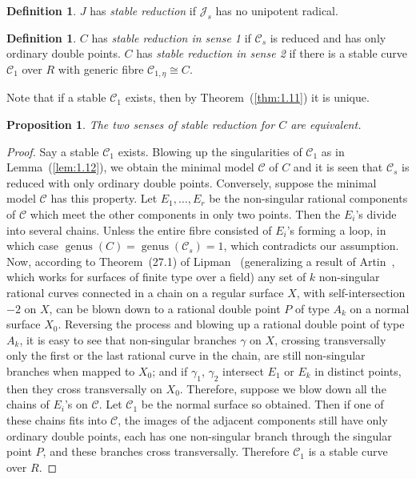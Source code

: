 \documentclass[10pt]{amsart}
\theoremstyle{plain}
\newtheorem{proposition}[theorem]{Proposition}
\theoremstyle{definition}
\newtheorem{definition}[theorem]{Definition}
\DeclareMathOperator{\genus}{genus}
\begin{document}
\begin{definition}\label{def:2.1}
$J$ has \emph{stable reduction} if $\mathscr{J}_s$ has no unipotent radical.
\end{definition}

\begin{definition}\label{def:2.2}
$C$ has \emph{stable reduction in sense 1} if $\mathscr{C}_s$ is reduced and has only ordinary double points. $C$ has \emph{stable reduction in sense 2} if there is a stable curve $\mathscr{C}_1$ over $R$ with generic fibre $\mathscr{C}_{1,\eta} \cong C$.
\end{definition}

Note that if a stable $\mathscr{C}_1$ exists, then by Theorem~(\ref{thm:1.11}) it is unique.

\begin{proposition}\label{prop:2.3}
The two senses of stable reduction for $C$ are equivalent.
\end{proposition}

\begin{proof}
Say a stable $\mathscr{C}_1$ exists. Blowing up the singularities of $\mathscr{C}_1$ as in Lemma~(\ref{lem:1.12}), we obtain the minimal model $\mathscr{C}$ of $C$ and it is seen that $\mathscr{C}_s$ is reduced with only ordinary double points. Conversely, suppose the minimal model $\mathscr{C}$ has this property. Let $E_1, \ldots, E_r$ be the non-singular rational components of $\mathscr{C}$ which meet the other components in only two points. Then the $E_i$'s divide into several chains. Unless the entire fibre consisted of $E_i$'s forming a loop, in which case $\genus(C) = \genus(\mathscr{C}_s) = 1$, which contradicts our assumption. Now, according to Theorem~(27.1) of Lipman~\cite{Li} (generalizing a result of Artin~\cite{A2}, which works for surfaces of finite type over a field) any set of $k$ non-singular rational curves connected in a chain on a regular surface $X$, with self-intersection $-2$ on $X$, can be blown down to a rational double point $P$ of type $A_k$ on a normal surface $X_0$. Reversing the process and blowing up a rational double point of type $A_k$, it is easy to see that non-singular branches $\gamma$ on $X$, crossing transversally only the first or the last rational curve in the chain, are still non-singular branches when mapped to $X_0$; and if $\gamma_1$, $\gamma_2$ intersect $E_1$ or $E_k$ in distinct points, then they cross transversally on $X_0$. Therefore, suppose we blow down all the chains of $E_i$'s on $\mathscr{C}$. Let $\mathscr{C}_1$ be the normal surface so obtained. Then if one of these chains fits into $\mathscr{C}$, the images of the adjacent components still have only ordinary double points, each has one non-singular branch through the singular point $P$, and these branches cross transversally. Therefore $\mathscr{C}_1$ is a stable curve over $R$.
\end{proof}
\end{document}
